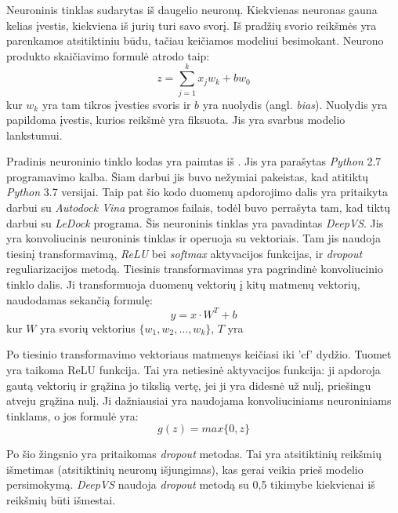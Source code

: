 Neuroninis tinklas sudarytas iš daugelio neuronų. Kiekvienas neuronas gauna kelias įvestis, kiekviena iš jurių turi savo svorį. Iš pradžių svorio reikšmės yra parenkamos atsitiktiniu būdu, tačiau keičiamos modeliui besimokant. Neurono produkto skaičiavimo formulė atrodo taip:
\begin{equation}
z=\sum_{j=1}^{k} x_{j} w_{k}+b w_{0}
\end{equation}
kur $w_k$ yra tam tikros įvesties svoris ir $b$ yra nuolydis (angl. \textit{bias}). Nuolydis yra papildoma įvestis, kurios reikšmė yra fiksuota. Jis yra svarbus modelio lankstumui.

Pradinis neuroninio tinklo kodas yra paimtas iš \cite{pereira_boosting_2016}. Jis yra parašytas \emph{Python} 2.7 programavimo kalba. Šiam darbui jis buvo nežymiai pakeistas, kad atitiktų \emph{Python} 3.7 versijai. Taip pat šio kodo duomenų apdorojimo dalis yra pritaikyta darbui su \emph{Autodock Vina} programos failais, todėl buvo perrašyta tam, kad tiktų darbui su \emph{LeDock} programa. Šis neuroninis tinklas yra pavadintas \emph{DeepVS}. Jis yra konvoliucinis neuroninis tinklas ir operuoja su vektoriais. Tam jis naudoja tiesinį transformavimą, \emph{ReLU} bei \emph{softmax} aktyvacijos funkcijas, ir \emph{dropout} reguliarizacijos metodą.
Tiesinis transformavimas yra pagrindinė konvoliucinio tinklo dalis. Ji transformuoja duomenų vektorių į kitų matmenų vektorių, naudodamas sekančią formulę:
\begin{equation}
y = x\cdot W^{T} + b
\end{equation}
kur $W$ yra svorių vektorius $\{w_1, w_2, ..., w_k\}$, $T$ yra 

Po tiesinio transformavimo vektoriaus matmenys keičiasi  iki 'cf' dydžio.  Tuomet yra taikoma ReLU funkcija. Tai yra netiesinė aktyvacijos funkcija: ji apdoroja gautą vektorių ir grąžina jo tikslią vertę, jei ji yra didesnė už nulį, priešingu atveju grąžina nulį. Ji dažniausiai yra naudojama konvoliuciniams neuroniniams tinklams, o jos formulė yra:
\begin{equation}
 g(z) = max\{0, z\}
\end{equation}

Po šio žingsnio yra pritaikomas \emph{dropout} metodas. Tai yra atsitiktinių reikšmių išmetimas (atsitiktinių neuronų išjungimas), kas gerai veikia prieš modelio persimokymą. \emph{DeepVS} naudoja \emph{dropout} metodą su 0,5 tikimybe kiekvienai iš reikšmių būti išmestai. 

